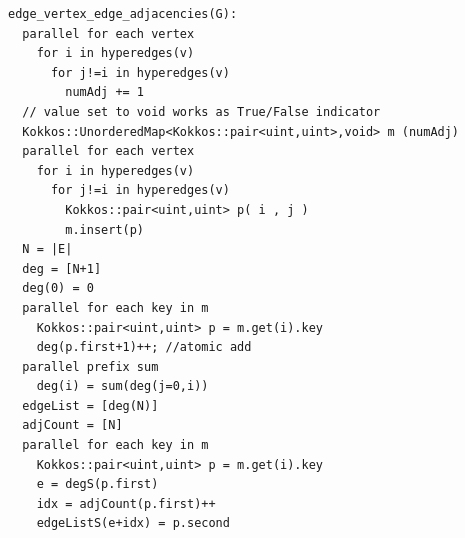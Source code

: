 \documentclass[graybox]{svmult}
\begin{document}
\begin{verbatim}
edge_vertex_edge_adjacencies(G):
  parallel for each vertex
    for i in hyperedges(v)
      for j!=i in hyperedges(v)
        numAdj += 1 
  // value set to void works as True/False indicator
  Kokkos::UnorderedMap<Kokkos::pair<uint,uint>,void> m (numAdj)
  parallel for each vertex
    for i in hyperedges(v)
      for j!=i in hyperedges(v)
        Kokkos::pair<uint,uint> p( i , j )
        m.insert(p)       
  N = |E|
  deg = [N+1]
  deg(0) = 0
  parallel for each key in m
    Kokkos::pair<uint,uint> p = m.get(i).key 
    deg(p.first+1)++; //atomic add    
  parallel prefix sum 
    deg(i) = sum(deg(j=0,i))  
  edgeList = [deg(N)]
  adjCount = [N]
  parallel for each key in m
    Kokkos::pair<uint,uint> p = m.get(i).key
    e = degS(p.first)
    idx = adjCount(p.first)++
    edgeListS(e+idx) = p.second
\end{verbatim}
\end{document}

